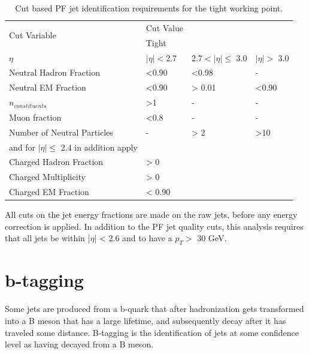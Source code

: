 \begin{table}[htbp]
    \caption{Cut based PF jet identification requirements for the tight working point.}
    \centering
    \begin{tabular}{llll}
        \hline
        \multirow{2}{*}{Cut Variable}               & Cut Value \\\cline{2-2}
                                                    & Tight\\ 
        \hline 
        $\eta$& $|\eta|<$2.7 &2.7$<|\eta|\leq$ 3.0  & $|\eta|>$ 3.0\\
        \hline 
        Neutral Hadron Fraction  & <0.90  & <0.98 & -\\  
        Neutral EM Fraction      & <0.90  & > 0.01 & <0.90\\
        $n_{constituents}$       & >1     & -      & - \\
        Muon fraction            & <0.8   & -      & -\\
        Number of Neutral Particles & - & > 2      & >10\\
        \hline
        and for $|\eta| \leq$ 2.4 in addition apply\\
        \hline
        Charged Hadron Fraction & > 0 \\
        Charged Multiplicity    & > 0 \\
        Charged EM Fraction     & < 0.90\\
        \hline 
    \end{tabular}
    \label{tab:PFJetID}
\end{table}

All cuts on the jet energy fractions are made on the raw jets, before any energy correction is applied. In addition to the PF jet quality cuts, this analysis requires that all jets be within |$\eta$| < 2.6 and to have a $p_{T} > $ 30 GeV. 

\section{b-tagging}
Some jets are produced from a b-quark that after hadronization gets transformed into a B meson that has a large lifetime, and subsequently decay after it has traveled some distance. B-tagging is the identification of jets at some confidence level as having decayed from a B meson.

